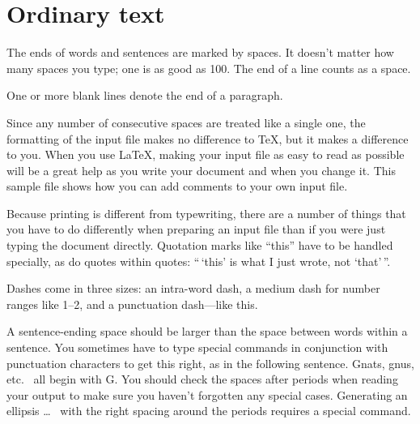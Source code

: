 \documentclass[fist]{svjour3}
\begin{document}
\section{Ordinary text}

The ends  of words and sentences are marked
  by   spaces. It  doesn't matter how many
spaces    you type; one is as good as 100.  The
end of   a line counts as a space.

One   or more   blank lines denote the  end
of  a paragraph.

Since any number of consecutive spaces are treated like a single
one, the formatting of the input file makes no difference to
      \TeX,         %
but it makes a difference to you.
When you use
      \LaTeX,       %
making your input file as easy to read as possible
will be a great help as you write your document and when you
change it.  This sample file shows how you can add comments to
your own input file.

Because printing is different from typewriting, there are a
number of things that you have to do differently when preparing
an input file than if you were just typing the document directly.
Quotation marks like
       ``this''
have to be handled specially, as do quotes within quotes:
       ``\,`this'                  %
    is what I just
    wrote, not  `that'\,''.

Dashes come in three sizes: an
       intra-word
dash, a medium dash for number ranges like
       1--2,
and a punctuation
       dash---like
this.

A sentence-ending space should be larger than the space between words
within a sentence.  You sometimes have to type special commands in
conjunction with punctuation characters to get this right, as in the
following sentence.
       Gnats, gnus, etc.\    %
       all begin with G\@.   %
You should check the spaces after periods when reading your output to
make sure you haven't forgotten any special cases.
Generating an ellipsis
       \ldots\    %
with the right spacing around the periods
requires a special  command.
\end{document}
